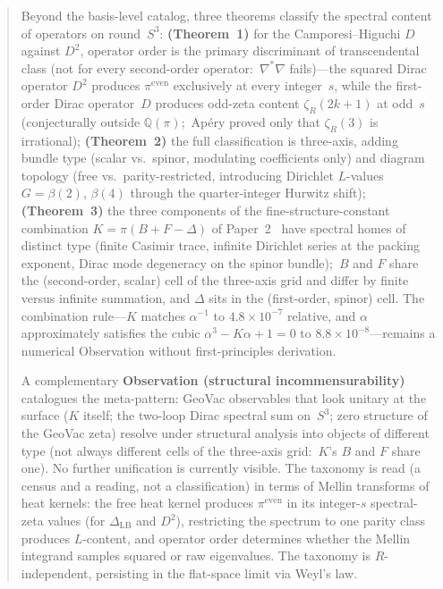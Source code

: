 \documentclass[aps,pra,twocolumn,superscriptaddress,longbibliography]{revtex4-2}
\begin{document}
\begin{abstract}
Beyond the basis-level catalog, three theorems classify the
spectral content of operators on round~$S^3$:
\textbf{(Theorem~1)} for the Camporesi--Higuchi $D$ against $D^2$,
operator order is the primary discriminant of transcendental class
(not for every second-order operator:\ $\nabla^*\nabla$ fails)---the
squared Dirac operator $D^2$ produces
$\pi^{\mathrm{even}}$ exclusively at every integer~$s$, while the
first-order Dirac operator~$D$ produces odd-zeta content
$\zeta_R(2k{+}1)$ at odd~$s$ (conjecturally outside $\mathbb{Q}(\pi)$;\
Ap\'ery proved only that $\zeta_R(3)$ is irrational);
\textbf{(Theorem~2)} the full classification is three-axis,
adding bundle type (scalar vs.\ spinor, modulating coefficients
only) and diagram topology (free vs.\ parity-restricted, introducing
Dirichlet $L$-values $G = \beta(2)$, $\beta(4)$ through the
quarter-integer Hurwitz shift);
\textbf{(Theorem~3)} the three components of the
fine-structure-constant combination $K = \pi(B + F - \Delta)$ of
Paper~2~\cite{loutey_paper2} have spectral homes of distinct type (finite Casimir trace, infinite Dirichlet series at
the packing exponent, Dirac mode degeneracy on the spinor bundle);\
$B$ and $F$ share the (second-order, scalar) cell of the three-axis
grid and differ by finite versus infinite summation, and $\Delta$ sits
in the (first-order, spinor) cell.  The combination
rule---$K$ matches $\alpha^{-1}$ to $4.8\times10^{-7}$ relative, and
$\alpha$ approximately satisfies the cubic $\alpha^3 - K\alpha + 1 = 0$
to $8.8\times10^{-8}$---remains a numerical Observation
without first-principles derivation.

A complementary \textbf{Observation (structural incommensurability)}
catalogues the meta-pattern: GeoVac observables that look unitary
at the surface ($K$ itself; the two-loop Dirac spectral sum on~$S^3$; zero structure
of the GeoVac zeta) resolve under structural analysis into objects
of different type (not always different cells of the three-axis grid:\
$K$'s $B$ and $F$ share one).  No further unification
is currently visible.  The taxonomy is read (a census and a reading,
not a classification) in terms of Mellin transforms of heat kernels: the free heat kernel produces
$\pi^{\mathrm{even}}$ in its integer-$s$ spectral-zeta values (for
$\Delta_{\mathrm{LB}}$ and $D^2$), restricting the spectrum to one
parity class produces $L$-content, and operator order determines whether
the Mellin integrand samples squared or raw eigenvalues.
The taxonomy is $R$-independent, persisting in the flat-space
limit via Weyl's law.
\end{abstract}
\end{document}
